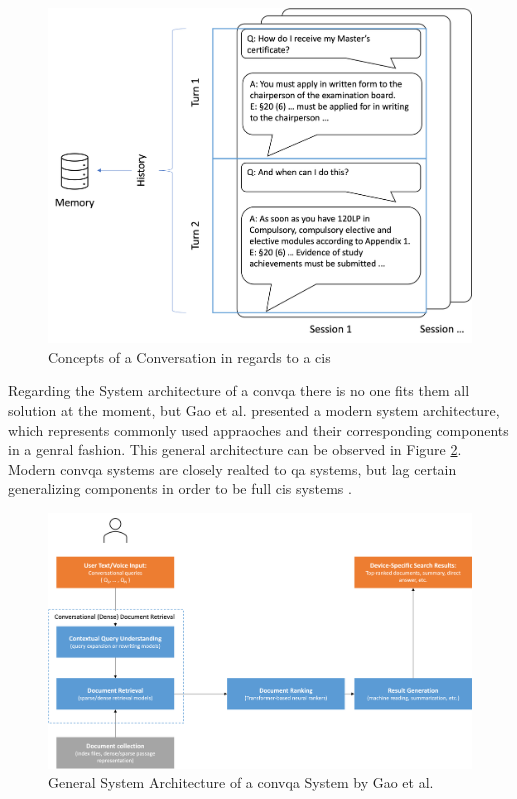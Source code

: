 \begin{figure}[h]
    \centering
    \includegraphics[width=\textwidth]{Grafiken/Conversation_Explain.png}
    \caption{Concepts of a Conversation in regards to a \gls{cis}}
    \label{fig:conversation_explain}
\end{figure}

Regarding the System architecture of a \gls{convqa} there is no one fits them all solution at the moment, but Gao et al. \cite{gao_neural_2022} presented a modern system architecture, which represents commonly used appraoches and their corresponding components in a genral fashion. This general architecture can be observed in Figure \ref{fig:convqa_system_architecture}. Modern \gls{convqa} systems are closely realted to \gls{qa} systems, but lag certain generalizing components in order to be full \gls{cis} systems \cite{zamani_conversational_2023}.

\begin{figure}
    \centering
    \includegraphics[width=\textwidth]{Grafiken/System_Architecture_ConQA.png}
    \caption{General System Architecture of a \gls{convqa} System by Gao et al. \cite{gao_neural_2022}}
    \label{fig:convqa_system_architecture}
\end{figure}

